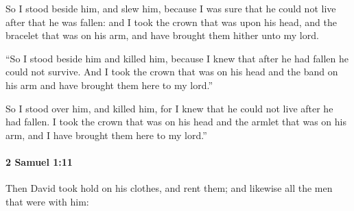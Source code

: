 			\begin{versebox}
					\item[BHS] 
					\item[ASV] So I stood beside him, and slew him, because I was sure that he could not live after that he was fallen: and I took the crown that was upon his head, and the bracelet that was on his arm, and have brought them hither unto my lord.
					\item[NIV] “So I stood beside him and killed him, because I knew that after he had fallen he could not survive. And I took the crown that was on his head and the band on his arm and have brought them here to my lord.”
					\item[NRSV] So I stood over him, and killed him, for I knew that he could not live after he had fallen. I took the crown that was on his head and the armlet that was on his arm, and I have brought them here to my lord.”
			\end{versebox}

		\paragraph{2 Samuel 1:11} %
			\label{2SAMUEL-1-11}

			Then David took hold on his clothes, and rent them; and likewise all the men that were with him:

